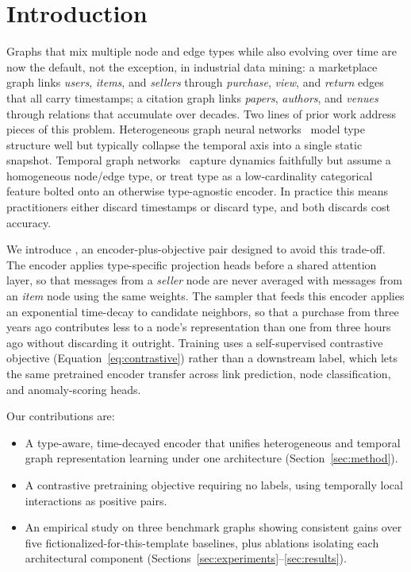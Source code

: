\section{Introduction}
Graphs that mix multiple node and edge types while also evolving over time are
now the default, not the exception, in industrial data mining: a marketplace
graph links \emph{users}, \emph{items}, and \emph{sellers} through
\emph{purchase}, \emph{view}, and \emph{return} edges that all carry
timestamps; a citation graph links \emph{papers}, \emph{authors}, and
\emph{venues} through relations that accumulate over decades. Two lines of
prior work address pieces of this problem. Heterogeneous graph neural
networks~\cite{tesfaye2019han,oyelaran2023heterogeneous} model type structure
well but typically collapse the temporal axis into a single static snapshot.
Temporal graph networks~\cite{brandt2022temporal,marceau2021dysat} capture
dynamics faithfully but assume a homogeneous node/edge type, or treat type as
a low-cardinality categorical feature bolted onto an otherwise
type-agnostic encoder. In practice this means practitioners either discard
timestamps or discard type, and both discards cost accuracy.

We introduce \sysname{}, an encoder-plus-objective pair designed to avoid
this trade-off. The encoder applies type-specific projection heads before a
shared attention layer, so that messages from a \emph{seller} node are never
averaged with messages from an \emph{item} node using the same weights. The
sampler that feeds this encoder applies an exponential time-decay to
candidate neighbors, so that a purchase from three years ago contributes
less to a node's representation than one from three hours ago without
discarding it outright. Training uses a self-supervised contrastive
objective (Equation~\ref{eq:contrastive}) rather than a downstream label,
which lets the same pretrained encoder transfer across link prediction,
node classification, and anomaly-scoring heads.

Our contributions are:
\begin{itemize}
  \item A type-aware, time-decayed encoder that unifies heterogeneous and
        temporal graph representation learning under one architecture
        (Section~\ref{sec:method}).
  \item A contrastive pretraining objective requiring no labels, using
        temporally local interactions as positive pairs.
  \item An empirical study on three benchmark graphs showing consistent
        gains over five fictionalized-for-this-template baselines, plus
        ablations isolating each architectural component
        (Sections~\ref{sec:experiments}--\ref{sec:results}).
\end{itemize}
